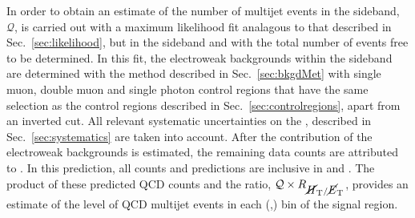 In order to obtain an estimate of the number of \QCD multijet events in
the sideband, $\mathcal{Q}$, is carried out with a maximum likelihood fit analagous to
that described in Sec.~\ref{sec:likelihood}, but in the \mhtmet
sideband and with the total number of \QCD events free to be
determined. In this fit,
the electroweak backgrounds within the sideband are determined with the method described
in Sec.~\ref{sec:bkgdMet} with single muon, double muon and single
photon control regions that have the same selection as the control
regions described in Sec.~\ref{sec:controlregions}, apart from an inverted
\mhtmet cut. All relevant systematic uncertainties on the \TFs,
described in Sec.~\ref{sec:systematics} are taken into account.  After the
contribution of the electroweak backgrounds is estimated, the
remaining data counts are attributed to \QCD. In this prediction, all
counts and predictions are inclusive in \nb and \MHT. The product of these
predicted QCD counts and the ratio, $\mathcal{Q} \times \mbox{$R_{\mbox{$\cancel{H}_\text{T}$} / \mbox{$\cancel{E}_\text{T}$}}$}$,
provides an estimate of the level of QCD multijet events in each
(\HT,\nj) bin of the signal region. 

